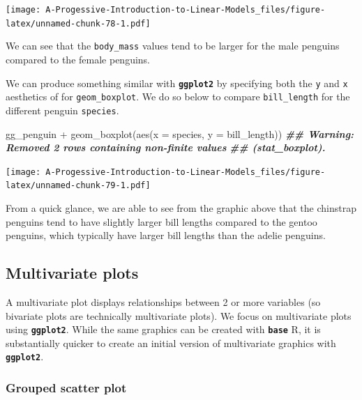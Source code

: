 \documentclass[
]{book}
\newenvironment{Shaded}{\begin{snugshade}}{\end{snugshade}}
\newcommand{\AttributeTok}[1]{\textcolor[rgb]{0.77,0.63,0.00}{#1}}
\newcommand{\DocumentationTok}[1]{\textcolor[rgb]{0.56,0.35,0.01}{\textbf{\textit{#1}}}}
\newcommand{\FunctionTok}[1]{\textcolor[rgb]{0.00,0.00,0.00}{#1}}
\newcommand{\NormalTok}[1]{#1}
\newcommand{\SpecialCharTok}[1]{\textcolor[rgb]{0.00,0.00,0.00}{#1}}
\theoremstyle{definition}
\theoremstyle{definition}
\theoremstyle{definition}
\theoremstyle{definition}
\theoremstyle{remark}
\begin{document}
\texttt{[image: A-Progessive-Introduction-to-Linear-Models\_files/figure-latex/unnamed-chunk-78-1.pdf]}

We can see that the \texttt{body\_mass} values tend to be larger for the male penguins compared to the female penguins.

We can produce something similar with \textbf{\texttt{ggplot2}} by specifying both the \texttt{y} and \texttt{x} aesthetics of for \texttt{geom\_boxplot}. We do so below to compare \texttt{bill\_length} for the different penguin \texttt{species}.

\begin{Shaded}
\begin{Highlighting}[]
\NormalTok{gg\_penguin }\SpecialCharTok{+} \FunctionTok{geom\_boxplot}\NormalTok{(}\FunctionTok{aes}\NormalTok{(}\AttributeTok{x =}\NormalTok{ species, }\AttributeTok{y =}\NormalTok{ bill\_length))}
\DocumentationTok{\#\# Warning: Removed 2 rows containing non{-}finite values}
\DocumentationTok{\#\# (stat\_boxplot).}
\end{Highlighting}
\end{Shaded}

\texttt{[image: A-Progessive-Introduction-to-Linear-Models\_files/figure-latex/unnamed-chunk-79-1.pdf]}

From a quick glance, we are able to see from the graphic above that the chinstrap penguins tend to have slightly larger bill lengths compared to the gentoo penguins, which typically have larger bill lengths than the adelie penguins.

\hypertarget{multivariate-plots}{%
\subsection{Multivariate plots}\label{multivariate-plots}}

A multivariate plot displays relationships between 2 or more variables (so bivariate plots are technically multivariate plots). We focus on multivariate plots using \textbf{\texttt{ggplot2}}. While the same graphics can be created with \textbf{\texttt{base}} R, it is substantially quicker to create an initial version of multivariate graphics with \textbf{\texttt{ggplot2}}.

\hypertarget{grouped-scatter-plot}{%
\subsubsection{Grouped scatter plot}\label{grouped-scatter-plot}}
\end{document}

